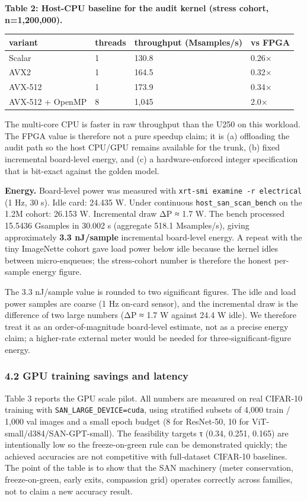 \documentclass[
]{article}
\begin{document}
\textbf{Table 2: Host-CPU baseline for the audit kernel (stress cohort,
n=1,200,000).}

\begin{longtable}[]{@{}llll@{}}
\toprule\noalign{}
variant & threads & throughput (Msamples/s) & vs FPGA \\
\midrule\noalign{}
\endhead
\bottomrule\noalign{}
\endlastfoot
Scalar & 1 & 130.8 & 0.26× \\
AVX2 & 1 & 164.5 & 0.32× \\
AVX-512 & 1 & 173.9 & 0.34× \\
AVX-512 + OpenMP & 8 & 1,045 & 2.0× \\
\end{longtable}

The multi-core CPU is faster in raw throughput than the U250 on this
workload. The FPGA value is therefore not a pure speedup claim; it is
(a) offloading the audit path so the host CPU/GPU remains available for
the trunk, (b) fixed incremental board-level energy, and (c) a
hardware-enforced integer specification that is bit-exact against the
golden model.

\textbf{Energy.} Board-level power was measured with
\texttt{xrt-smi\ examine\ -r\ electrical} (1 Hz, 30 s). Idle card:
24.435 W. Under continuous \texttt{host\_san\_scan\_bench} on the 1.2M
cohort: 26.153 W. Incremental draw ΔP ≈ 1.7 W. The bench processed
15.5436 Gsamples in 30.002 s (aggregate 518.1 Msamples/s), giving
approximately \textbf{3.3 nJ/sample} incremental board-level energy. A
repeat with the tiny ImageNette cohort gave load power below idle
because the kernel idles between micro-enqueues; the stress-cohort
number is therefore the honest per-sample energy figure.

The 3.3 nJ/sample value is rounded to two significant figures. The idle
and load power samples are coarse (1 Hz on-card sensor), and the
incremental draw is the difference of two large numbers (ΔP ≈ 1.7 W
against 24.4 W idle). We therefore treat it as an order-of-magnitude
board-level estimate, not as a precise energy claim; a higher-rate
external meter would be needed for three-significant-figure energy.

\hypertarget{gpu-training-savings-and-latency}{%
\subsubsection{4.2 GPU training savings and
latency}\label{gpu-training-savings-and-latency}}

Table 3 reports the GPU scale pilot. All numbers are measured on real
CIFAR-10 training with \texttt{SAN\_LARGE\_DEVICE=cuda}, using
stratified subsets of 4,000 train / 1,000 val images and a small epoch
budget (8 for ResNet-50, 10 for ViT-small/d384/SAN-GPT-small). The
feasibility targets τ (0.34, 0.251, 0.165) are intentionally low so the
freeze-on-green rule can be demonstrated quickly; the achieved
accuracies are not competitive with full-dataset CIFAR-10 baselines. The
point of the table is to show that the SAN machinery (meter
conservation, freeze-on-green, early exits, compassion grid) operates
correctly across families, not to claim a new accuracy result.
\end{document}
